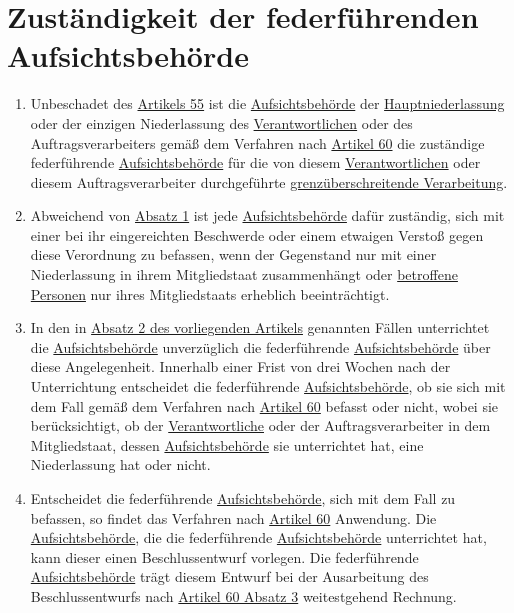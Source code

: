 \chapter{Zuständigkeit der federführenden Aufsichtsbehörde}
\label{ch:56}


\begin{enumerate}

  \item Unbeschadet des \hyperref[ch:55]{Artikels 55} ist die \hyperref[itm:04-21]{Aufsichtsbehörde} der \hyperref[itm:04-16]{Hauptniederlassung} oder der einzigen
   Niederlassung des \hyperref[itm:04-7]{Verantwortlichen} oder des Auftragsverarbeiters gemäß dem Verfahren nach \hyperref[ch:60]
   {Artikel 60} die zuständige federführende \hyperref[itm:04-21]{Aufsichtsbehörde} für die von diesem \hyperref[itm:04-7]{Verantwortlichen} oder diesem
   Auftragsverarbeiter durchgeführte \hyperref[itm:04-23]{grenzüberschreitende Verarbeitung}.
  \label{itm:56-1}

  \item Abweichend von \hyperref[itm:56-1]{Absatz 1} ist jede \hyperref[itm:04-21]{Aufsichtsbehörde} dafür zuständig, sich mit einer bei ihr
   eingereichten Beschwerde oder einem etwaigen Verstoß gegen diese Verordnung zu befassen, wenn der Gegenstand nur mit
   einer Niederlassung in ihrem Mitgliedstaat zusammenhängt oder \hyperref[itm:04-1]{betroffene Personen} nur ihres Mitgliedstaats erheblich
   beeinträchtigt.
  \label{itm:56-2}

  \item In den in \hyperref[itm:56-2]{Absatz 2 des vorliegenden Artikels} genannten Fällen unterrichtet die
   \hyperref[itm:04-21]{Aufsichtsbehörde} unverzüglich die federführende \hyperref[itm:04-21]{Aufsichtsbehörde} über diese Angelegenheit. Innerhalb einer Frist von
   drei Wochen nach der Unterrichtung entscheidet die federführende \hyperref[itm:04-21]{Aufsichtsbehörde}, ob sie sich mit dem Fall gemäß
   dem Verfahren nach \hyperref[ch:60]{Artikel 60} befasst oder nicht, wobei sie berücksichtigt, ob der \hyperref[itm:04-7]{Verantwortliche}
   oder der Auftragsverarbeiter in dem Mitgliedstaat, dessen \hyperref[itm:04-21]{Aufsichtsbehörde} sie unterrichtet hat, eine Niederlassung
   hat oder nicht.
  \label{itm:56-3}

  \item Entscheidet die federführende \hyperref[itm:04-21]{Aufsichtsbehörde}, sich mit dem Fall zu befassen, so findet das Verfahren nach
   \hyperref[ch:60]{Artikel 60} Anwendung. Die \hyperref[itm:04-21]{Aufsichtsbehörde}, die die federführende \hyperref[itm:04-21]{Aufsichtsbehörde} unterrichtet
    hat, kann dieser einen Beschlussentwurf vorlegen. Die federführende \hyperref[itm:04-21]{Aufsichtsbehörde} trägt diesem Entwurf bei der
    Ausarbeitung des Beschlussentwurfs nach \hyperref[itm:60-3]{Artikel 60 Absatz 3} weitestgehend Rechnung.
  \label{itm:56-4}


\end{enumerate}
